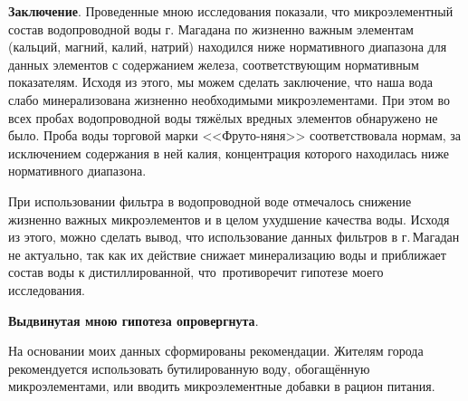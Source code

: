 \textbf{Заключение}. Проведенные мною исследования показали, что микроэлементный состав водопроводной воды г. Магадана по жизненно важным элементам (кальций, магний, калий, натрий) находился ниже нормативного диапазона для данных элементов с содержанием железа, соответствующим нормативным показателям. Исходя из этого, мы можем сделать заключение, что наша вода слабо минерализована жизненно необходимыми микроэлементами. При этом во всех пробах водопроводной воды тяжёлых вредных элементов обнаружено не было. Проба воды торговой марки <<Фруто-няня>> соответствовала нормам, за исключением содержания в ней калия, концентрация которого находилась ниже нормативного диапазона.

При использовании фильтра в водопроводной воде отмечалось снижение жизненно важных микроэлементов и в целом ухудшение качества воды. Исходя из этого, можно сделать вывод, что использование данных фильтров в г.\,Магадан не актуально, так как их действие снижает минерализацию воды и приближает состав воды к дистиллированной, что~противоречит гипотезе моего исследования.

\textbf{Выдвинутая мною гипотеза опровергнута}.

На основании моих данных сформированы рекомендации. Жителям города рекомендуется использовать бутилированную воду, обогащённую микроэлементами, или вводить микроэлементные добавки в рацион питания.
